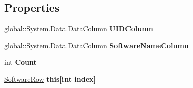 \subsection*{Properties}
\begin{DoxyCompactItemize}
\item 
global\+::\+System.\+Data.\+Data\+Column {\bfseries U\+I\+D\+Column}\hypertarget{class_products_1_1_data_1_1ds_sage_1_1_software_data_table_a296cdecc9b7ed6b818b733d46c220c01}{}\label{class_products_1_1_data_1_1ds_sage_1_1_software_data_table_a296cdecc9b7ed6b818b733d46c220c01}

\item 
global\+::\+System.\+Data.\+Data\+Column {\bfseries Software\+Name\+Column}\hypertarget{class_products_1_1_data_1_1ds_sage_1_1_software_data_table_afa36f4040ad906c6cbfba6c78c8de5ca}{}\label{class_products_1_1_data_1_1ds_sage_1_1_software_data_table_afa36f4040ad906c6cbfba6c78c8de5ca}

\item 
int {\bfseries Count}\hypertarget{class_products_1_1_data_1_1ds_sage_1_1_software_data_table_aa151567f894e0d9d9049ccc32eb03428}{}\label{class_products_1_1_data_1_1ds_sage_1_1_software_data_table_aa151567f894e0d9d9049ccc32eb03428}

\item 
\hyperlink{class_products_1_1_data_1_1ds_sage_1_1_software_row}{Software\+Row} {\bfseries this\mbox{[}int index\mbox{]}}\hypertarget{class_products_1_1_data_1_1ds_sage_1_1_software_data_table_aedf230d7b0f3edade68722d14bdbd506}{}\label{class_products_1_1_data_1_1ds_sage_1_1_software_data_table_aedf230d7b0f3edade68722d14bdbd506}

\end{DoxyCompactItemize}
